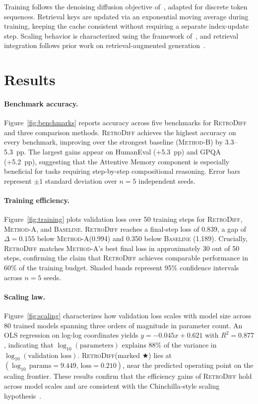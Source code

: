 \documentclass[10pt]{article}
\newcommand{\Cref}[1]{Figure~\ref{#1}}
\newcommand{\methodname}{\textsc{RetroDiff}\xspace}
\newcommand{\baselineA}{\textsc{Method-A}\xspace}
\newcommand{\baselineB}{\textsc{Method-B}\xspace}
\newcommand{\baselineC}{\textsc{Baseline}\xspace}
\begin{document}
Training follows the denoising diffusion objective of~\cite{ho2020denoising},
adapted for discrete token sequences. Retrieval keys are updated via an exponential
moving average during training, keeping the cache consistent without requiring a
separate index-update step. Scaling behavior is characterized using the framework
of~\cite{kaplan2020scaling}, and retrieval integration follows prior work on
retrieval-augmented generation~\cite{zhang2024retrieval}.

\section{Results}
\label{sec:results}

\paragraph*{Benchmark accuracy.}
\Cref{fig:benchmarks} reports accuracy across five benchmarks for \methodname and
three comparison methods. \methodname achieves the highest accuracy on every
benchmark, improving over the strongest baseline (\baselineB) by
3.3--5.3~pp. The largest gains appear on HumanEval (+5.3~pp) and
GPQA (+5.2~pp), suggesting that the Attentive Memory component is especially
beneficial for tasks requiring step-by-step compositional reasoning. Error bars
represent $\pm1$ standard deviation over $n{=}5$ independent seeds.

\paragraph*{Training efficiency.}
\Cref{fig:training} plots validation loss over 50 training steps for \methodname,
\baselineA, and \baselineC. \methodname reaches a final-step loss of 0.839,
a gap of $\Delta{=}0.155$ below \baselineA (0.994) and 0.350 below \baselineC
(1.189). Crucially, \methodname matches \baselineA's best final loss in
approximately 30 out of 50 steps, confirming the claim that \methodname achieves
comparable performance in 60\% of the training budget. Shaded bands represent
95\% confidence intervals across $n{=}5$ seeds.

\paragraph*{Scaling law.}
\Cref{fig:scaling} characterizes how validation loss scales with model size across
80 trained models spanning three orders of magnitude in parameter count. An OLS
regression on log-log coordinates yields $y = -0.045x + 0.621$ with
$R^{2} = 0.877$, indicating that $\log_{10}(\text{parameters})$ explains 88\% of
the variance in $\log_{10}(\text{validation loss})$. \methodname (marked $\bigstar$)
lies at $(\log_{10}\,\text{params}{=}9.449,\, \text{loss}{=}0.210)$, near the
predicted operating point on the scaling frontier. These results confirm that the
efficiency gains of \methodname hold across model scales and are consistent with the
Chinchilla-style scaling hypothesis~\cite{kaplan2020scaling}.
\end{document}
